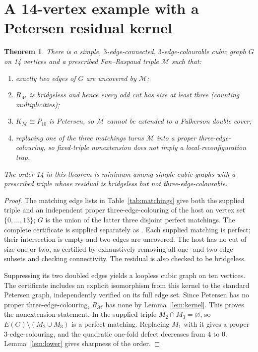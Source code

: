 \documentclass[11pt]{article}
\newtheorem{theorem}{Theorem}
\newcommand{\PM}{\mathcal M}
\begin{document}
\section{A 14-vertex example with a Petersen residual kernel}
\begin{theorem}\label{thm:main}
There is a simple, $3$-edge-connected, $3$-edge-colourable cubic graph $G$ on 14 vertices and a prescribed Fan--Raspaud triple $\PM$ such that:
\begin{enumerate}[leftmargin=2em,noitemsep]
\item exactly two edges of $G$ are uncovered by $\PM$;
\item $R_{\PM}$ is bridgeless and hence every odd cut has size at least three (counting multiplicities);
\item $K_{\PM}\cong P_{10}$ is Petersen, so $\PM$ cannot be extended to a Fulkerson double cover;
\item replacing \emph{one} of the three matchings turns $\PM$ into a proper three-edge-colouring, so fixed-triple nonextension does not imply a local-reconfiguration trap.
\end{enumerate}
The order 14 in this theorem is minimum among simple cubic graphs with a prescribed triple whose residual is bridgeless but not three-edge-colourable.
\end{theorem}
\begin{proof}
The matching edge lists in Table~\ref{tab:matchings} give both the supplied triple and an independent proper three-edge-colouring of the host on vertex set $\{0,\ldots,13\}$; $G$ is the union of the latter three disjoint perfect matchings. The complete certificate is supplied separately as . Each supplied matching is perfect; their intersection is empty and two edges are uncovered. The host has no cut of size one or two, as certified by exhaustively removing all one- and two-edge subsets and checking connectivity. The residual is also checked to be bridgeless.

Suppressing its two doubled edges yields a loopless cubic graph on ten vertices. The certificate includes an explicit isomorphism from this kernel to the standard Petersen graph, independently verified on its full edge set. Since Petersen has no proper three-edge-colouring, $R_{\PM}$ has none by Lemma~\ref{lem:kernel}. This proves the nonextension statement. In the supplied triple $M_2\cap M_3=\varnothing$, so $E(G)\setminus(M_2\cup M_3)$ is a perfect matching. Replacing $M_1$ with it gives a proper $3$-edge-colouring, and the quadratic one-fold defect decreases from $4$ to $0$. Lemma~\ref{lem:lower} gives sharpness of the order.
\end{proof}
\end{document}
